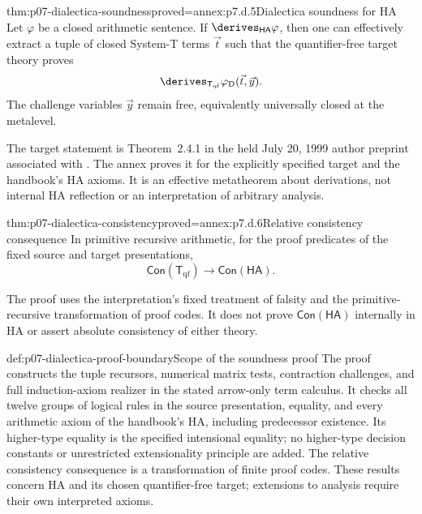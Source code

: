 

\begin{hbtheorem}{thm:p07-dialectica-soundness}{proved=annex:p7.d.5}{Dialectica soundness for HA}
Let \(\varphi\) be a closed arithmetic sentence.  If
\(\derives_{\mathsf{HA}}\varphi\), then
one can effectively extract a tuple of closed System-T terms \(\vec t\) such that
the quantifier-free target theory proves
\[
  \derives_{\mathsf T_{\mathrm{qf}}}\varphi_{\mathrm D}(\vec t,\vec y).
\]
The challenge variables \(\vec y\) remain free, equivalently universally
closed at the metalevel.
\end{hbtheorem}

The target statement is Theorem~2.4.1 in the held July 20, 1999 author
preprint associated with \cite{AvigadFeferman1998}. The annex proves it
for the explicitly specified target and the handbook's HA axioms.
It is an effective metatheorem about derivations, not internal HA
reflection or an interpretation of arbitrary analysis.

\begin{hbcorollary}{thm:p07-dialectica-consistency}{proved=annex:p7.d.6}{Relative consistency consequence}
In primitive recursive arithmetic, for the proof predicates of the
fixed source and target presentations,
\[
  \mathsf{Con}(\mathsf T_{\mathrm{qf}})\to\mathsf{Con}(\mathsf{HA}).
\]
\end{hbcorollary}

The proof uses the interpretation's fixed treatment of falsity and the
primitive-recursive transformation of proof codes. It does not prove
\(\mathsf{Con}(\mathsf{HA})\) internally in HA or assert absolute
consistency of either theory.

\begin{hbconvention}{def:p07-dialectica-proof-boundary}{Scope of the soundness proof}
The proof constructs the tuple recursors, numerical matrix tests,
contraction challenges, and full induction-axiom realizer in the stated
arrow-only term calculus. It checks all twelve groups of logical rules
in the source presentation, equality, and every arithmetic axiom of the
handbook's HA, including predecessor existence. Its higher-type equality
is the specified intensional equality; no higher-type decision constants
or unrestricted extensionality principle are added. The relative
consistency consequence is a transformation of finite proof codes.
These results concern HA and its chosen quantifier-free target; extensions
to analysis require their own interpreted axioms.
\end{hbconvention}

